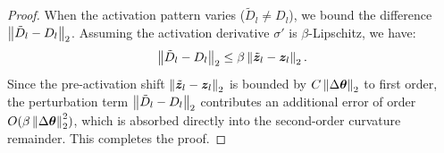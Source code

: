 \begin{proof}
When the activation pattern varies ($\tilde{D}_l \ne D_l$), we bound the difference $\left\lVert\tilde{D}_l - D_l\right\rVert_2$. Assuming the activation derivative $\sigma'$ is $\beta$-Lipschitz, we have:
\begin{equation}
\left\lVert\tilde{D}_l - D_l\right\rVert_2 \le \beta \left\lVert\tilde{\bm{z}}_l - \bm{z}_l\right\rVert_2 .
\end{equation}
Since the pre-activation shift $\left\lVert\tilde{\bm{z}}_l - \bm{z}_l\right\rVert_2$ is bounded by $C \left\lVert\Delta\bm{\theta}\right\rVert_2$ to first order, the perturbation term $\left\lVert\tilde{D}_l - D_l\right\rVert_2$ contributes an additional error of order $O(\beta \left\lVert\Delta\bm{\theta}\right\rVert_2^2)$, which is absorbed directly into the second-order curvature remainder. This completes the proof.
\end{proof}
